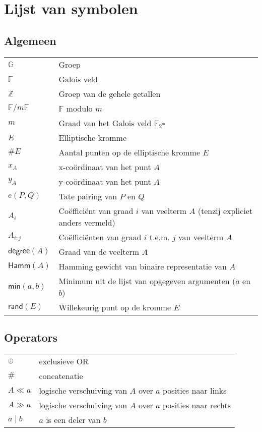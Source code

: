 \chapter*{Lijst van symbolen}

\section*{Algemeen}

\begin{tabular}{l@{$\qquad$}l}
$\mathbb{G}$	& Groep\\
$\mathbb{F}$	& Galois veld\\
$\mathbb{Z}$	& Groep van de gehele getallen\\
$\mathbb{F}/m\mathbb{F}$	& $\mathbb{F}$ modulo $m$\\
$m$				& Graad van het Galois veld $\mathbb{F}_{2^m}$\\
$E$				& Elliptische kromme\\
$\#E$				& Aantal punten op de elliptische kromme $E$\\
$x_A$				& x-co\"ordinaat van het punt $A$\\
$y_A$				& y-co\"ordinaat van het punt $A$\\
$e(P, Q)$		& Tate pairing van $P$ en $Q$\\
$A_i$				& Co\"effici\"ent van graad $i$ van veelterm $A$ (tenzij expliciet anders vermeld)\\
$A_{i:j}$				& Co\"effici\"enten van graad $i$ t.e.m. $j$ van veelterm $A$\\
$\textsf{degree}(A)$	& Graad van de veelterm $A$\\
$\textsf{Hamm}(A)$	& Hamming gewicht van binaire representatie van $A$\\
$\textsf{min}(a, b)$	& Minimum  uit de lijst van opgegeven argumenten ($a$ en $b$)\\
$\textsf{rand}(E)$	& Willekeurig punt op de kromme $E$\\
\end{tabular}

\section*{Operators}

\begin{tabular}{l@{$\qquad$}l}
$\oplus$	& exclusieve OR\\
$\#$		& concatenatie\\
$A \ll a$	& logische verschuiving van $A$ over $a$ posities naar links\\
$A \gg a$	& logische verschuiving van $A$ over $a$ posities naar rechts\\
$a \mid b$	& $a$ is een deler van $b$\\
\end{tabular}
